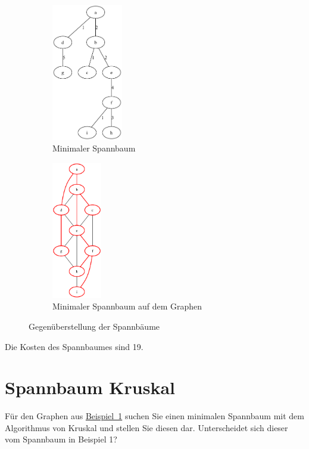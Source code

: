 \documentclass[a4paper,11pt]{report}
\begin{document}
    \begin{figure}[htbp]
        \centering
        \begin{subfigure}[b]{0.45\textwidth}
            \centering
            \includegraphics[width=\textwidth, height=6cm, keepaspectratio]{a01a_mst}
            \caption{Minimaler Spannbaum}
            \label{fig:a01_mst}
        \end{subfigure}
        \begin{subfigure}[b]{0.45\textwidth}
            \centering
            \includegraphics[width=\textwidth, height=6cm, keepaspectratio]{a01a_graph_highlighted}
            \caption{Minimaler Spannbaum auf dem Graphen}
            \label{fig:a01_graph_highlighted}
        \end{subfigure}
        \caption{Gegenüberstellung der Spannbäume}
        \label{fig:a01_comparison}
    \end{figure}

    Die Kosten des Spannbaumes sind 19.

    \newpage

    \chapter{Spannbaum Kruskal}
    \label{ch:sbkruskal}
    Für den Graphen aus \hyperref[fig:a01_graph]{Beispiel~1} suchen Sie einen minimalen Spannbaum mit dem Algorithmus von
    Kruskal und stellen Sie diesen dar. Unterscheidet sich dieser vom Spannbaum in Beispiel 1?
\end{document}
